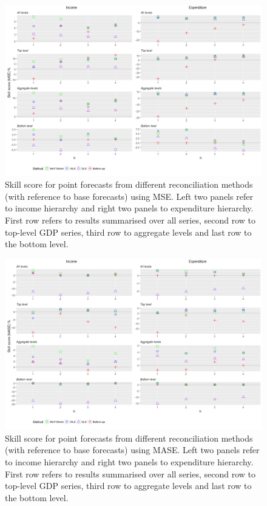 \documentclass[graybox]{svmult}
\begin{document}
\begin{figure}[t]
	\centering
	\small
	\includegraphics[width=\textwidth]{Figs/Results/PointF_MSE.png}
	\caption{Skill score for point forecasts from different reconciliation methods (with reference to base forecasts) using MSE. Left two panels refer to income hierarchy and right two panels to expenditure hierarchy. First row refers to results summarised over all series, second row to top-level GDP series, third row to aggregate levels and last row to the bottom level.}
	\label{fig: PointF_MSE}
\end{figure}

\begin{figure}[t]
	\centering
	\small
	\includegraphics[width=\textwidth]{Figs/Results/PointF_MASE.png}
	\caption{Skill score for point forecasts from different reconciliation methods (with reference to base forecasts) using MASE. Left two panels refer to income hierarchy and right two panels to expenditure hierarchy. First row refers to results summarised over all series, second row to top-level GDP series, third row to aggregate levels and last row to the bottom level.}
	\label{fig: PointF_MASE}
\end{figure}
\end{document}
